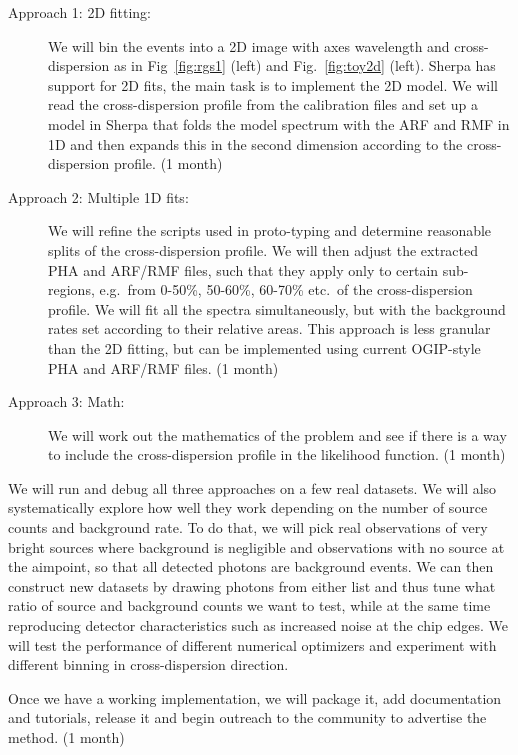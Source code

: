 \documentclass[fleqn,12pt,onecolumn]{SelfArx} %
\begin{document}
\begin{description}
    \item[Approach 1: 2D fitting:] We will bin the events into a 2D image with axes wavelength and cross-dispersion as in Fig~\ref{fig:rgs1} (left) and Fig.~\ref{fig:toy2d} (left). Sherpa has support for 2D fits, the main task is to implement the 2D model. We will read the cross-dispersion profile from the calibration files and set up a model in Sherpa that folds the model spectrum with the ARF and RMF in 1D and then expands this in the second dimension according to the cross-dispersion profile. (1 month)
    \item[Approach 2: Multiple 1D fits:] We will refine the scripts used in proto-typing and determine reasonable splits of the cross-dispersion profile. We will then adjust the extracted PHA and ARF/RMF files, such that they apply only to certain sub-regions, e.g.\ from 0-50\%, 50-60\%, 60-70\% etc.\ of the cross-dispersion profile. We will fit all the spectra simultaneously, but with the background rates set according to their relative areas. This approach is less granular than the 2D fitting, but can be implemented using current OGIP-style PHA and ARF/RMF files. (1 month)
    \item[Approach 3: Math:] We will work out the mathematics of the problem and see if there is a way to include the cross-dispersion profile in the likelihood function. (1 month)
\end{description}

We will run and debug all three approaches on a few real datasets. We will also systematically explore how well they work depending on the number of source counts and background rate. To do that, we will pick real observations of very bright sources where background is negligible and observations with no source at the aimpoint, so that all detected photons are background events. We can then construct new datasets by drawing photons from either list and thus tune what ratio of source and background counts we want to test, while at the same time reproducing detector characteristics such as increased noise at the chip edges. We will test the performance of different numerical optimizers and experiment with different binning in cross-dispersion direction.

Once we have a working implementation, we will package it, add documentation and tutorials, release it and begin outreach to the community to advertise the method. (1 month)

\end{document}
